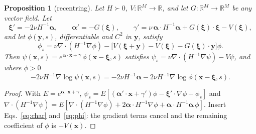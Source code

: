 \documentclass[11pt,a4paper]{article}
\newtheorem{proposition}{Proposition}
\theoremstyle{remark}
\newcommand{\x}{\mathbf x}
\begin{document}
\begin{proposition}[recentring]
\label{prop:recentre}
Let $H\succ0$, $V:\mathbb R^M\to\mathbb R$, and let $G:\mathbb R^M\to\mathbb R^M$ be any vector field. Let
\begin{equation}
 \boldsymbol\xi'=-2\nu H^{-1}\boldsymbol\alpha,\qquad\boldsymbol\alpha'=-G(\boldsymbol\xi),\qquad
 \gamma'=\nu\,\boldsymbol\alpha\!\cdot\!H^{-1}\boldsymbol\alpha+G(\boldsymbol\xi)\!\cdot\!\boldsymbol\xi-V(\boldsymbol\xi),
 \label{eq:char}
\end{equation}
and let $\phi(\mathbf y,s)$, differentiable and $C^2$ in $\mathbf y$, satisfy
\begin{equation}
 \phi_s=\nu\nabla\!\cdot(H^{-1}\nabla\phi)-\bigl[V(\boldsymbol\xi+\mathbf y)-V(\boldsymbol\xi)-G(\boldsymbol\xi)\!\cdot\!\mathbf y\bigr]\phi .
 \label{eq:phi}
\end{equation}
Then $\psi(\x,s)=e^{\boldsymbol\alpha\cdot\x+\gamma}\,\phi(\x-\boldsymbol\xi,s)$ satisfies
$\psi_s=\nu\nabla\!\cdot(H^{-1}\nabla\psi)-V\psi$, and where $\phi>0$
\begin{equation}
 -2\nu H^{-1}\nabla\log\psi(\x,s)=-2\nu H^{-1}\boldsymbol\alpha-2\nu H^{-1}\nabla\log\phi(\x-\boldsymbol\xi,s).
 \label{eq:refcontrol}
\end{equation}
\end{proposition}
\begin{proof}
With $E=e^{\boldsymbol\alpha\cdot\x+\gamma}$, $\psi_s=E[(\boldsymbol\alpha'\!\cdot\x+\gamma')\phi-\boldsymbol\xi'\!\cdot\nabla\phi+\phi_s]$ and
$\nabla\!\cdot(H^{-1}\nabla\psi)=E[\nabla\!\cdot(H^{-1}\nabla\phi)+2\boldsymbol\alpha\!\cdot H^{-1}\nabla\phi+\boldsymbol\alpha\!\cdot H^{-1}\boldsymbol\alpha\,\phi]$.
Insert Eqs.~\eqref{eq:char} and~\eqref{eq:phi}: the gradient terms cancel and the remaining
coefficient of $\phi$ is $-V(\x)$.
\end{proof}
\end{document}
